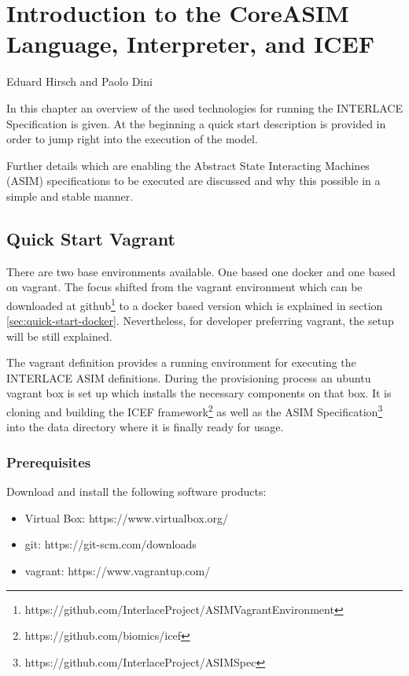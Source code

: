 \chapter{Introduction to the CoreASIM Language, Interpreter, and ICEF}
\label{ch:CoreAsimIntro}

\vspace{-1cm}
\begin{center}
Eduard Hirsch and Paolo Dini
\end{center}

In this chapter an overview of the used technologies for running the INTERLACE Specification is given. At the beginning a quick start description is provided in order to jump right into the execution of the model.

Further details which are enabling the Abstract State Interacting Machines (ASIM) specifications to be executed are discussed and why this possible in a simple and stable manner.

\section{Quick Start Vagrant}
\label{sec:quick-start-vagrant}

There are two base environments available. One based one docker and one based on vagrant. The focus shifted from the vagrant environment which can be downloaded at github\footnote{https://github.com/InterlaceProject/ASIMVagrantEnvironment} to a docker based version which is explained in section \ref{sec:quick-start-docker}. Nevertheless, for developer preferring vagrant, the setup will be still explained.

The vagrant definition provides a running environment for executing the INTERLACE ASIM definitions. During the provisioning process an ubuntu vagrant box is set up which installs the necessary components on that box. It is cloning and building the ICEF framework\footnote{https://github.com/biomics/icef} as well as the ASIM Specification\footnote{https://github.com/InterlaceProject/ASIMSpec} into the data directory where it is finally ready for usage.

\subsection{Prerequisites}

Download and install the following software products:

\begin{itemize}
	\item Virtual Box: https://www.virtualbox.org/
	\item git: https://git-scm.com/downloads
	\item vagrant: https://www.vagrantup.com/
\end{itemize}

